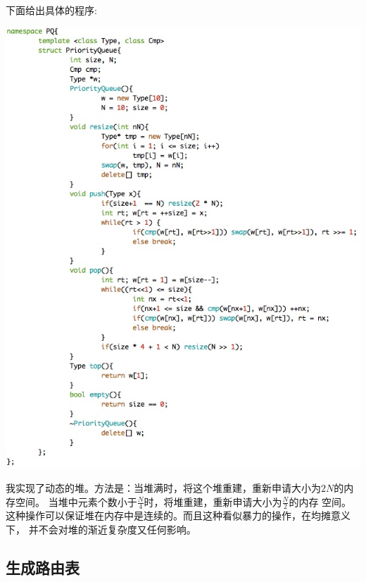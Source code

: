 \documentclass{article}
\begin{document}
		\paragraph{}
			下面给出具体的程序:
			\begin{center}
			\includegraphics[width = 15cm]{pq.jpeg}\\
			\end{center}
			我实现了动态的堆。方法是：当堆满时，将这个堆重建，重新申请大小为$2N$的内存空间。
			当堆中元素个数小于$\frac{N}{4}$时，将堆重建，重新申请大小为$\frac{N}{2}$的内存
			空间。这种操作可以保证堆在内存中是连续的。而且这种看似暴力的操作，在均摊意义下，
			并不会对堆的渐近复杂度又任何影响。
	\subsection{生成路由表}
\end{document}
